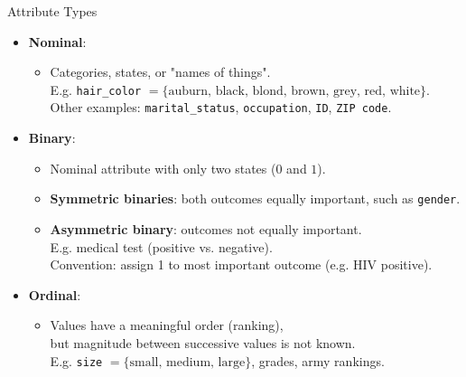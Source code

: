 \begin{frame}{Attribute Types}
	\begin{itemize}
		\item \textbf{Nominal}:
		      \begin{itemize}
			      \item Categories, states, or "names of things".\\
			            E.g. \texttt{hair\_color} $= \{\text{auburn, black, blond, brown, grey, red, white}\}$.\\
			            Other examples: \texttt{marital\_status}, \texttt{occupation}, \texttt{ID}, \texttt{ZIP code}.
		      \end{itemize}
		\item \textbf{Binary}:
		      \begin{itemize}
			      \item Nominal attribute with only two states ($0$ and $1$).
			      \item \textbf{Symmetric binaries}: both outcomes equally important, such as \texttt{gender}.
			      \item \textbf{Asymmetric binary}: outcomes not equally important. \\
			            E.g. medical test (positive vs. negative).\\
			            Convention: assign 1 to most important outcome (e.g. HIV positive).
		      \end{itemize}
		\item \textbf{Ordinal}:
		      \begin{itemize}
			      \item Values have a meaningful order (ranking),\\
			            but magnitude between successive values is not known.\\
			            E.g. \texttt{size} $= \{\text{small, medium, large}\}$, grades, army rankings.
		      \end{itemize}
	\end{itemize}
\end{frame}

